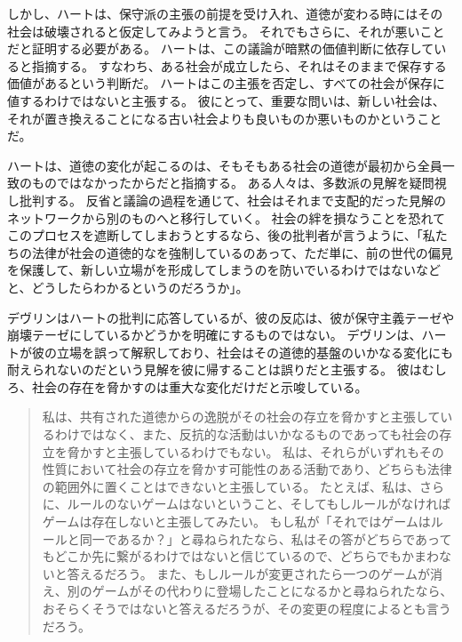 \documentclass[paper=a4,book,openany]{jlreq} \usepackage{mystyle}
\begin{document}
しかし、ハートは、保守派の主張の前提を受け入れ、道徳が変わる時にはその社会は破壊されると仮定してみようと言う。
それでもさらに、それが悪いことだと証明する必要がある。
ハートは、この議論が暗黙の価値判断に依存していると指摘する。
すなわち、ある社会が成立したら、それはそのままで保存する価値があるという判断だ。
ハートはこの主張を否定し、すべての社会が保存に値するわけではないと主張する。
彼にとって、重要な問いは、新しい社会は、それが置き換えることになる古い社会よりも良いものか悪いものかということだ。

ハートは、道徳の変化が起こるのは、そもそもある社会の道徳が最初から全員一致のものではなかったからだと指摘する。
ある人々は、多数派の見解を疑問視し批判する。
反省と議論の過程を通じて、社会はそれまで支配的だった見解のネットワークから別のものへと移行していく。
社会の絆を損なうことを恐れてこのプロセスを遮断してしまおうとするなら、後の批判者が言うように、「私たちの法律が社会の道徳的なを強制しているのあって、ただ単に、前の世代の偏見を保護して、新しい立場がを形成してしまうのを防いでいるわけではないなどと、どうしたらわかるというのだろうか」\citep[p.169]{bix00:_juris}。

デヴリンはハートの批判に応答しているが、彼の反応は、彼が保守主義テーゼや崩壊テーゼにしているかどうかを明確にするものではない。
デヴリンは、ハートが彼の立場を誤って解釈しており、社会はその道徳的基盤のいかなる変化にも耐えられないのだという見解を彼に帰することは誤りだと主張する。
彼はむしろ、社会の存在を脅かすのは重大な変化だけだと示唆している。

\begin{quote}
私は、共有された道徳からの逸脱がその社会の存立を脅かすと主張しているわけではなく、また、反抗的な活動はいかなるものであっても社会の存立を脅かすと主張しているわけでもない。
私は、それらがいずれもその性質において社会の存立を脅かす可能性のある活動であり、どちらも法律の範囲外に置くことはできないと主張している。
たとえば、私は、さらに、ルールのないゲームはないということ、そしてもしルールがなければゲームは存在しないと主張してみたい。
もし私が「それではゲームはルールと同一であるか？」と尋ねられたなら、私はその答がどちらであってもどこか先に繋がるわけではないと信じているので、どちらでもかまわないと答えるだろう。
また、もしルールが変更されたら一つのゲームが消え、別のゲームがその代わりに登場したことになるかと尋ねられたなら、おそらくそうではないと答えるだろうが、その変更の程度によるとも言うだろう。
\citep[p.37]{devlin65:_enfor_moral}
 \end{quote}
\end{document}
